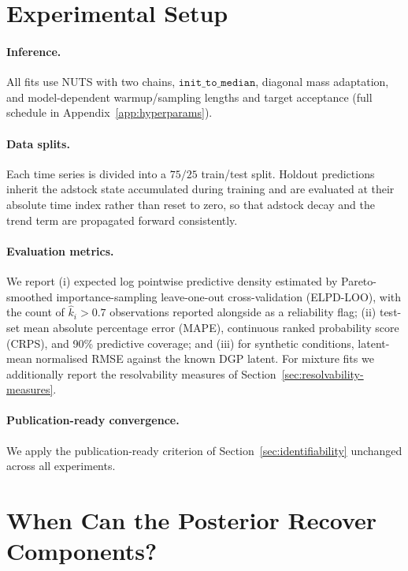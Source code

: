 \documentclass[11pt]{article}
\begin{document}
\section{Experimental Setup}
\label{sec:setup}

\paragraph{Inference.} All fits use NUTS with two chains, $\texttt{init\_to\_median}$, diagonal mass adaptation, and model-dependent warmup/sampling lengths and target acceptance (full schedule in Appendix~\ref{app:hyperparams}).

\paragraph{Data splits.} Each time series is divided into a $75/25$ train/test split. Holdout predictions inherit the adstock state accumulated during training and are evaluated at their absolute time index rather than reset to zero, so that adstock decay and the trend term are propagated forward consistently.

\paragraph{Evaluation metrics.} We report (i) expected log pointwise predictive density estimated by Pareto-smoothed importance-sampling leave-one-out cross-validation (ELPD-LOO), with the count of $\hat k_i > 0.7$ observations reported alongside as a reliability flag; (ii) test-set mean absolute percentage error (MAPE), continuous ranked probability score (CRPS), and 90\% predictive coverage; and (iii) for synthetic conditions, latent-mean normalised RMSE against the known DGP latent. For mixture fits we additionally report the resolvability measures of Section~\ref{sec:resolvability-measures}.

\paragraph{Publication-ready convergence.} We apply the publication-ready criterion of Section~\ref{sec:identifiability} unchanged across all experiments.

\section{When Can the Posterior Recover Components?}
\label{sec:recovery}
\end{document}

